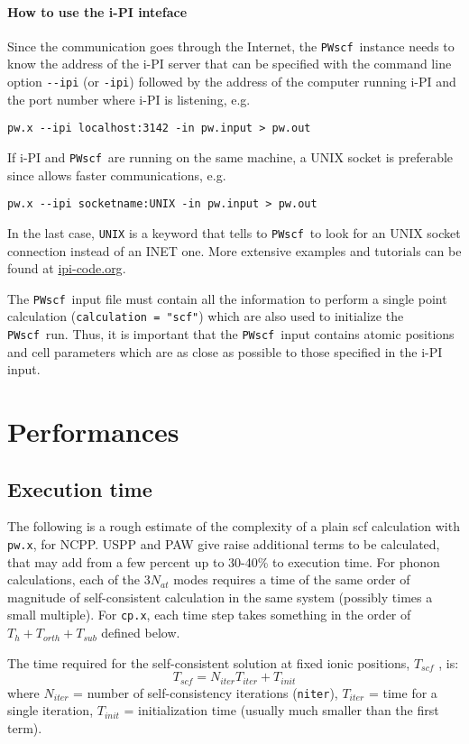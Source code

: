\documentclass[12pt,a4paper]{article}
\def\PWscf{\texttt{PWscf}}
\def\pwx{\texttt{pw.x}}
\def\cpx{\texttt{cp.x}}
\begin{document}
\paragraph{How to use the i-PI inteface}
Since the communication goes through the Internet, the
\PWscf\ instance needs to know the address of the i-PI server that can
be specified with the command line option \verb#--ipi# (or
\verb#-ipi#) followed by the address of the computer running i-PI and
the port number where i-PI is listening, e.g. 
\begin{verbatim}
pw.x --ipi localhost:3142 -in pw.input > pw.out
\end{verbatim}
If i-PI and \PWscf\ are running on the same machine, a UNIX socket is
preferable since allows faster communications, e.g.  
\begin{verbatim}
pw.x --ipi socketname:UNIX -in pw.input > pw.out
\end{verbatim}
In the last case, \verb#UNIX# is a keyword that tells to \PWscf\ to
look for an UNIX socket connection instead of an INET one. More
extensive examples and tutorials can be found at \url{ipi-code.org}. 

\noindent The \PWscf\ input file must contain all the information to
perform a single point calculation (\verb#calculation = "scf"#) which
are also used to initialize the \PWscf\ run. Thus, it is important
that the \PWscf\ input contains atomic positions and cell parameters
which are as close as possible to those specified in the i-PI input. 

\section{Performances}

\subsection{Execution time}

The following is a rough estimate of the complexity of a plain
scf calculation with \pwx, for NCPP. USPP and PAW 
give raise additional terms to be calculated, that may add from a 
few percent 
up to 30-40\% to execution time. For phonon calculations, each of the
$3N_{at}$ modes requires a time of the same order of magnitude of
self-consistent calculation in the same system (possibly times a small multiple). 
For \cpx, each time step takes something in the order of
$T_h + T_{orth} + T_{sub}$ defined below.

The time required for the self-consistent solution at fixed ionic
positions, $T_{scf}$ , is:
$$T_{scf} = N_{iter} T_{iter} + T_{init}$$
where $N_{iter}$  = number of self-consistency iterations (\texttt{niter}), 
$T_{iter}$ =
time for a single iteration, $T_{init}$ = initialization time
(usually much smaller than the first term).
\end{document}

